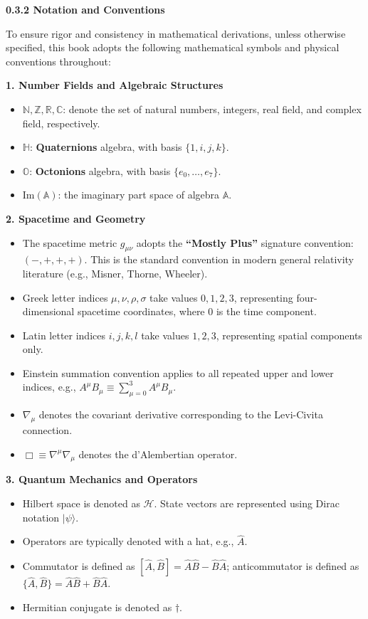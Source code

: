 \textbf{0.3.2 Notation and Conventions}

To ensure rigor and consistency in mathematical derivations, unless otherwise specified, this book adopts the following mathematical symbols and physical conventions throughout:

\textbf{1. Number Fields and Algebraic Structures}
\begin{itemize}
\item $\mathbb{N}, \mathbb{Z}, \mathbb{R}, \mathbb{C}$: denote the set of natural numbers, integers, real field, and complex field, respectively.
\item $\mathbb{H}$: \textbf{Quaternions} algebra, with basis $\{1, i, j, k\}$.
\item $\mathbb{O}$: \textbf{Octonions} algebra, with basis $\{e_0, \dots, e_7\}$.
\item $\text{Im}(\mathbb{A})$: the imaginary part space of algebra $\mathbb{A}$.
\end{itemize}

\textbf{2. Spacetime and Geometry}
\begin{itemize}
\item The spacetime metric $g_{\mu\nu}$ adopts the \textbf{``Mostly Plus''} signature convention: $(-, +, +, +)$. This is the standard convention in modern general relativity literature (e.g., Misner, Thorne, Wheeler).
\item Greek letter indices $\mu, \nu, \rho, \sigma$ take values $0, 1, 2, 3$, representing four-dimensional spacetime coordinates, where $0$ is the time component.
\item Latin letter indices $i, j, k, l$ take values $1, 2, 3$, representing spatial components only.
\item Einstein summation convention applies to all repeated upper and lower indices, e.g., $A^\mu B_\mu \equiv \sum_{\mu=0}^3 A^\mu B_\mu$.
\item $\nabla_\mu$ denotes the covariant derivative corresponding to the Levi-Civita connection.
\item $\Box \equiv \nabla^\mu \nabla_\mu$ denotes the d'Alembertian operator.
\end{itemize}

\textbf{3. Quantum Mechanics and Operators}
\begin{itemize}
\item Hilbert space is denoted as $\mathcal{H}$. State vectors are represented using Dirac notation $|\psi\rangle$.
\item Operators are typically denoted with a hat, e.g., $\hat{A}$.
\item Commutator is defined as $[\hat{A}, \hat{B}] = \hat{A}\hat{B} - \hat{B}\hat{A}$; anticommutator is defined as $\{\hat{A}, \hat{B}\} = \hat{A}\hat{B} + \hat{B}\hat{A}$.
\item Hermitian conjugate is denoted as $\dagger$.
\end{itemize}

